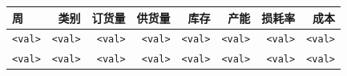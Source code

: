 \begin{tabular}{lrrrrrrr}
\toprule
\textbf{周} & \textbf{类别} & \textbf{订货量} & \textbf{供货量} & \textbf{库存} & \textbf{产能} & \textbf{损耗率} & \textbf{成本} \\\midrule
\texttt{<val>} & \texttt{<val>} & \texttt{<val>} & \texttt{<val>} & \texttt{<val>} & \texttt{<val>} & \texttt{<val>} & \texttt{<val>} \\
\texttt{<val>} & \texttt{<val>} & \texttt{<val>} & \texttt{<val>} & \texttt{<val>} & \texttt{<val>} & \texttt{<val>} & \texttt{<val>} \\\bottomrule
\end{tabular}
